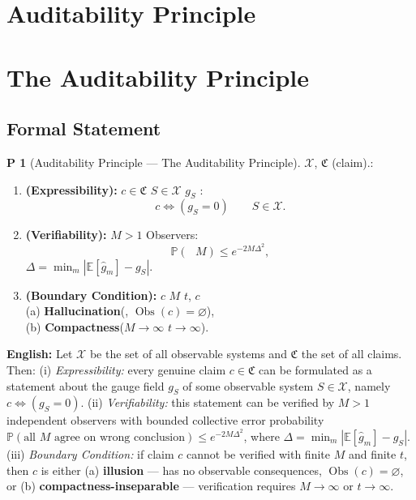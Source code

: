 \documentclass[12pt,a4paper]{article}
\theoremstyle{plain}
\theoremstyle{definition}
\newtheorem{principle}[theorem]Principle
\theoremstyle{remark}
\newcommand{\E}{\mathbb{E}}
\newcommand{\Pbb}{\mathbb{P}}
\newcommand{\X}{\mathcal{X}}
\newcommand{\ClaimSpace}{\mathfrak{C}}
\newcommand{\Null}{\varnothing}
\DeclareMathOperator{\ObsSet}{Obs}
\begin{document}
\section{Auditability Principle}
\section{The Auditability Principle}
\subsection{}
\subsection{Formal Statement}
\begin{principle}[Auditability Principle --- The Auditability Principle]\label{pr:AP}
 $\X$, $\ClaimSpace$ (claim).: 
\begin{enumerate}[label=(\roman*)]
 \item \textbf{ (Expressibility):} $c \in \ClaimSpace$ $S \in \X$ $g_S$ : 
 \begin{equation}\label{eq:AP_express}
 c \iff (g_S = 0) \quad \text{} \quad S \in \X.
 \end{equation}
 \item \textbf{ (Verifiability):} $M > 1$ Observers: 
 \begin{equation}\label{eq:AP_verify}
 \Pbb(\text{ $M$}) \leq e^{-2M\Delta^2},
 \end{equation}
 $\Delta = \min_m |\E[\hat{g}_m] - g_S|$.
 \item \textbf{ (Boundary Condition):} $c$ $M$ $t$, $c$ \\
 (a) \textbf{Hallucination}(, $\ObsSet(c) = \Null$), \\
 (b) \textbf{Compactness}($M \to \infty$ $t \to \infty$).
\end{enumerate}
\end{principle}
\vspace{6pt}
\noindent
\textbf{English:} Let $\X$ be the set of all observable systems and $\ClaimSpace$ the set of all claims. Then: (i) \textit{Expressibility:} every genuine claim $c \in \ClaimSpace$ can be formulated as a statement about the gauge field $g_S$ of some observable system $S \in \X$, namely $c \iff (g_S = 0)$. (ii) \textit{Verifiability:} this statement can be verified by $M > 1$ independent observers with bounded collective error probability $\Pbb(\text{all $M$ agree on wrong conclusion}) \leq e^{-2M\Delta^2}$, where $\Delta = \min_m |\E[\hat{g}_m] - g_S|$. (iii) \textit{Boundary Condition:} if claim $c$ cannot be verified with finite $M$ and finite $t$, then $c$ is either (a) \textbf{illusion} --- has no observable consequences, $\ObsSet(c) = \Null$, or (b) \textbf{compactness-inseparable} --- verification requires $M \to \infty$ or $t \to \infty$.
\end{document}
